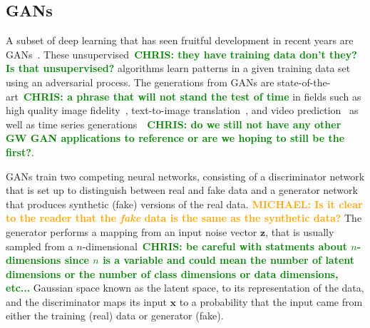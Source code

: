 \documentclass[12pt]{iopart}
\newcommand{\chris}[1]{\textbf{\textcolor{green}{CHRIS: #1}}}
\newcommand{\michael}[1]{\textbf{\textcolor{orange}{MICHAEL: #1}}}
\begin{document}
\subsection{GANs}
%
%
A subset of deep learning that has seen fruitful development in recent years
are \acp{GAN}~\cite{Goodfellow2014}. These unsupervised~\chris{they have
training data don't they? Is that unsupervised?} algorithms learn patterns in a
given training data set using an adversarial process. The generations from
\acp{GAN} are state-of-the-art~\chris{a phrase that will not stand the test of
time} in fields such as high quality image
fidelity~\cite{brock2018large,karras2019analyzing}, text-to-image
translation~\cite{reed2016generative}, and video
prediction~\cite{liang2017dual} as well as time series
generations~\cite{esteban2017realvalued}~\chris{do we still not have any other
GW GAN applications to reference or are we hoping to still be the first?}. 

%
\acp{GAN} train two competing neural networks, consisting of a discriminator
network that is set up to distinguish between real and fake data and a
generator network that produces synthetic (fake) versions of the real data.
\michael{Is it clear to the reader that the \textit{fake} data is the same as
the synthetic data?} The generator performs a mapping from an input noise
vector $\mathbf{z}$, that is usually sampled from a $n$-dimensional~\chris{be
careful with statments about $n$-dimensions since $n$ is a variable and could
mean the number of latent dimensions or the number of class dimensions or data
dimensions, etc...} Gaussian space known as the latent space, to its
representation of the data, and the discriminator maps its input $\mathbf{x}$ to
a probability that the input came from either the training (real) data or
generator (fake). 
\end{document}
